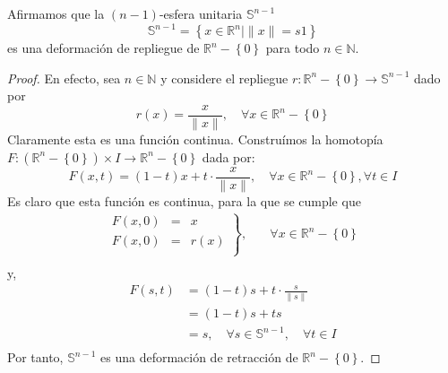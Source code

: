\documentclass[12pt]{report}
\theoremstyle{largebreak}
\newcommand\cf[3]{\ensuremath{#1:#2\rightarrow#3}}
\begin{document}
    \begin{exa}
        Afirmamos que la $(n-1)$-esfera unitaria $\mathbb{S}^{ n-1}$
        \begin{equation*}
            \mathbb{S}^{ n-1}=\left\{x\in\mathbb{R}^n\Big|\|x\|=s1 \right\}
        \end{equation*}
        es una deformación de repliegue de $\mathbb{R}^n-\left\{0\right\}$ para todo $n\in\mathbb{N}$.
    \end{exa}

    \begin{proof}
        En efecto, sea $n\in\mathbb{N}$ y considere el repliegue $\cf{r}{\mathbb{R}^n-\left\{0\right\}}{\mathbb{S}^{ n-1}}$ dado por
        \begin{equation*}
            r(x)=\frac{x}{\|x\|},\quad\forall x\in\mathbb{R}^n-\left\{0\right\}
        \end{equation*}
        Claramente esta es una función continua. Construímos la homotopía $\cf{F}{(\mathbb{R}^n-\left\{0\right\})\times I}{\mathbb{R}^n-\left\{0\right\}}$ dada por:
        \begin{equation*}
            F(x,t)=(1-t)x+t\cdot\frac{x}{\|x\|},\quad\forall x\in \mathbb{R}^n-\left\{0\right\}, \forall t\in I
        \end{equation*}
        Es claro que esta función es continua, para la que se cumple    que
        \begin{equation*}
            \begin{split}
                \left.
                    \begin{array}{rcl}
                        F(x,0) & = & x\\
                        F(x,0) & = & r(x)\\
                    \end{array}
                \right\},&\quad\forall x\in\mathbb{R}^n-\left\{0\right\}\\
            \end{split}
        \end{equation*}
        y,
        \begin{equation*}
            \begin{split}
                F(s,t)&=(1-t)s+t\cdot\frac{s}{\|s\|}\\
                &=(1-t)s+ts\\
                &=s,\quad\forall s\in\mathbb{S}^{ n-1},\quad\forall t\in I \\
            \end{split}
        \end{equation*}
        Por tanto, $\mathbb{S}^{ n-1}$ es una deformación de retracción de $\mathbb{R}^n-\left\{0\right\}$.
    \end{proof}
\end{document}
